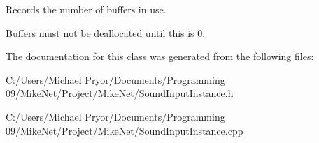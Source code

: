 Records the number of buffers in use. 

Buffers must not be deallocated until this is 0. 

The documentation for this class was generated from the following files:\begin{DoxyCompactItemize}
\item 
C:/Users/Michael Pryor/Documents/Programming 09/MikeNet/Project/MikeNet/SoundInputInstance.h\item 
C:/Users/Michael Pryor/Documents/Programming 09/MikeNet/Project/MikeNet/SoundInputInstance.cpp\end{DoxyCompactItemize}

